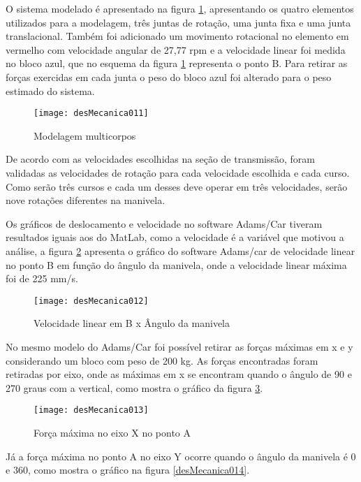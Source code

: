 		O sistema modelado é apresentado na figura \ref{desMecanica011}, apresentando os quatro elementos utilizados para a modelagem, três juntas de rotação, uma junta fixa e uma junta translacional. Também foi adicionado um movimento rotacional no elemento em vermelho com velocidade angular de 27,77 rpm e a velocidade linear foi medida no bloco azul, que no esquema da figura \ref{desMecanica011} representa o ponto B. Para retirar as forças exercidas em cada junta o peso do bloco azul foi alterado para o peso estimado do sistema.

		\begin{figure}[!h]
			\centering
			\texttt{[image: desMecanica011]}
			\caption{Modelagem multicorpos}
			\label{desMecanica011}
		\end{figure}

		De acordo com as velocidades escolhidas na seção de transmissão, foram validadas as velocidades de rotação para cada velocidade escolhida e cada curso. Como serão três cursos e cada um desses deve operar em três velocidades, serão nove rotações diferentes na manivela. 
		
		Os gráficos de deslocamento e velocidade no software Adams/Car tiveram resultados iguais aos do MatLab, como a velocidade é a variável que motivou a análise, a figura \ref{desMecanica012} apresenta o gráfico do software Adams/car de velocidade linear no ponto B em função do ângulo da manivela, onde a velocidade linear máxima foi de 225 mm/s.

		\begin{figure}[!h]
			\centering
			\texttt{[image: desMecanica012]}
			\caption{Velocidade linear em B x Ângulo da manivela}
			\label{desMecanica012}
		\end{figure}

		No mesmo modelo do Adams/Car foi possível retirar as forças máximas em x e y considerando um bloco com peso de 200 kg. As forças encontradas foram retiradas por eixo, onde as máximas em x se encontram quando o ângulo de 90 e 270 graus com a vertical, como mostra o gráfico da figura \ref{desMecanica013}.

		
		\begin{figure}[!h]
			\centering
			\texttt{[image: desMecanica013]}
			\caption{Força máxima no eixo X no ponto A}
			\label{desMecanica013}
		\end{figure}

		Já a força máxima no ponto A no eixo Y ocorre quando o ângulo da manivela é 0 e 360, como mostra o gráfico na figura \ref{desMecanica014}.

